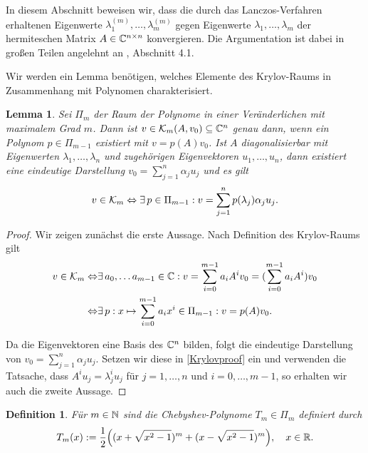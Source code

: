 \documentclass{article}
\theoremstyle{plain}
\newtheorem{lemma}      [theorem]{Lemma}
\newtheorem{definition} [theorem]{Definition}
\begin{document}
In diesem Abschnitt beweisen wir, dass die durch das Lanczos-Verfahren erhaltenen Eigenwerte $\lambda_1^{(m)},\dots,\lambda_m^{(m)}$ gegen Eigenwerte $\lambda_1,\dots,\lambda_m$ der hermiteschen Matrix $A \in \mathbb{C}^{n \times n}$ konvergieren. Die Argumentation ist dabei in großen Teilen angelehnt an \cite{EWPs}, Abschnitt 4.1.

Wir werden ein Lemma benötigen, welches Elemente des Krylov-Raums in Zusammenhang mit Polynomen charakterisiert.

\begin{lemma}
	\label{v0_Polynom_Darstellung}
	Sei $\Pi_m$ der Raum der Polynome in einer Veränderlichen mit maximalem Grad $m$. Dann ist $v \in \mathcal{K}_m(A,v_0) \subseteq \mathbb{C}^n$ genau dann, wenn ein Polynom $p \in \Pi_{m-1}$ existiert mit $v = p(A)v_0$. \newline
	Ist $A$ diagonalisierbar mit Eigenwerten $\lambda_1, \dots, \lambda_n$ und zugehörigen Eigenvektoren $u_1, \dots, u_n$, dann existiert eine eindeutige Darstellung $v_0 = \sum_{j=1}^{n} \alpha_j u_j$ und es gilt
	\begin{align*}
		v \in \mathcal{K}_m \Leftrightarrow \exists \, p \in \Pi_{m-1}: v = \sum_{j=1}^{n} p(\lambda_j)\alpha_j u_j.
	\end{align*}
\end{lemma}

\begin{proof}
	Wir zeigen zunächst die erste Aussage. Nach Definition des Krylov-Raums gilt
	\begin{align}\label{Krylovproof}
		v \in \mathcal{K}_m \Leftrightarrow& \exists \, a_0, \dots a_{m-1} \in \mathbb{C}: v = \sum_{i=0}^{m-1} a_i A^i v_0 = (\sum_{i=0}^{m-1} a_i A^i)v_0\\
		\Leftrightarrow& \exists \, p: x \mapsto \sum_{i=0}^{m-1} a_i x^i \in \Pi_{m-1}: v = p(A)v_0.
	\end{align}

	Da die Eigenvektoren eine Basis des $\mathbb{C}^n$ bilden, folgt die eindeutige Darstellung von $v_0 = \sum_{j=1}^{n} \alpha_j u_j$. Setzen wir diese in \eqref{Krylovproof} ein und verwenden die Tatsache, dass $A^i u_j = \lambda_j^i u_j$ für $j=1,\dots, n $ und $i = 0, \dots, m-1$, so erhalten wir auch die zweite Aussage.
\end{proof}


\begin{definition}
	Für $m \in \mathbb{N}$ sind die Chebyshev-Polynome $T_m \in \Pi_m$ definiert durch
	\begin{align}\label{chebyshev}
		T_m(x) := \frac{1}{2}\Big((x+ \sqrt{x^2 - 1})^m + (x- \sqrt{x^2 - 1})^m\Big), \quad x \in \mathbb{R}.
	\end{align}
\end{definition}
\end{document}
